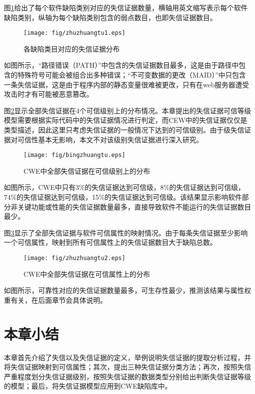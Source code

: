 图\ref{fig:cweEvidences}给出了每个软件缺陷类别对应的失信证据数量，横轴用英文缩写表示每个软件缺陷类别，纵轴为每个缺陷类别包含的弱点数目，也即失信证据数目。
\begin{figure}[htb]
\centering
\texttt{[image: fig/zhuzhuangtu1.eps]}\\
\caption{各缺陷类目对应的失信证据分布}
\label{fig:cweEvidences}
\end{figure}

如图所示，“路径错误（PATH）”中包含的失信证据数目最多，这是由于路径中包含的特殊符号可能会被组合出多种错误；“不可变数据的更改（MAID）”中只包含一条失信证据，这是由于程序内部的静态变量很难被更改，只有在web服务器遭受攻击时才有可能被恶意篡改。

图\ref{fig:cweLevel}显示全部失信证据在4个可信级别上的分布情况。本章提出的失信证据可信等级模型需要根据实际代码中的失信证据情况进行判定，而CEW中的失信证据仅仅是类型描述，因此这里只考虑失信证据的一般情况下达到的可信级别。由于\uppercase\expandafter{}级失信证据对可信性基本无影响，本文不对该级别失信证据进行深入研究。
\begin{figure}[htb]
\centering
\texttt{[image: fig/bingzhuangtu.eps]}\\
\caption{CWE中全部失信证据在可信级别上的分布}
\label{fig:cweLevel}
\end{figure}

如图所示，CWE中只有3\%的失信证据达到可信\uppercase\expandafter{}级，8\%的失信证据达到可信\uppercase\expandafter{}级，74\%的失信证据达到可信\uppercase\expandafter{}级，15\%的失信证据达到可信\uppercase\expandafter{}级。该结果显示影响软件部分非关键功能或性能的失信证据数量最多，直接导致软件不能运行的失信证据数目最少。

图\ref{fig:cweAttr}显示了全部失信证据与软件可信属性的映射情况。由于每条失信证据至少影响一个可信属性，映射到所有可信属性上的失信证据数目大于缺陷总数。
\begin{figure}[htb]
\centering
\texttt{[image: fig/zhuzhuangtu2.eps]}\\
\caption{CWE中全部失信证据在可信属性上的分布}
\label{fig:cweAttr}
\end{figure}

如图所示，可靠性对应的失信证据数量最多，可生存性最少，推测该结果与属性权重有关，在后面章节会具体说明。
\section{本章小结}

本章首先介绍了失信以及失信证据的定义，举例说明失信证据的提取分析过程，并将失信证据映射到可信属性；其次，提出三种失信证据分类方法；再次，按照失信严重程度划分失信证据级别，按照失信证据的数据类型分别给出判断失信证据等级的模型；最后，将失信证据模型应用到CWE缺陷库中。


